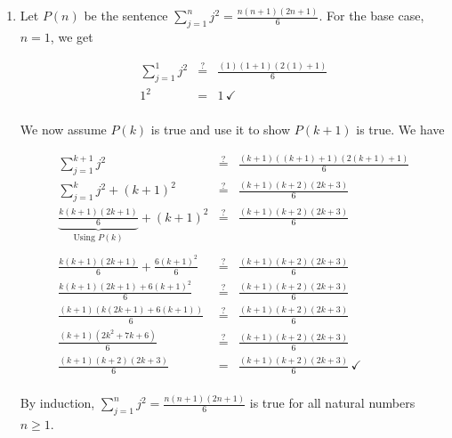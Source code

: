 \documentclass{ximera}
\begin{document}
	\author{Stitz-Zeager}




\setcounter{footnote}{0}


\begin{enumerate}

\item  Let $P(n)$ be the sentence $\displaystyle{ \sum_{j=1}^{n} j^2 = \frac{n(n+1)(2n+1)}{6}}$. For the base case, $n=1$, we get

\[ \begin{array}{rcl} 

\displaystyle{ \sum_{j=1}^{1} j^2} & \stackrel{?}{=} &  \frac{(1)(1+1)(2(1)+1)}{6} \\ [15pt]
 1^2  & = & 1 \, \checkmark \\ \end{array} \]


We now assume $P(k)$ is true and use it to show $P(k+1)$ is true.  We have


\[ \begin{array}{rcl} 

\displaystyle{ \sum_{j=1}^{k+1} j^2} & \stackrel{?}{=} &  \frac{(k+1)((k+1)+1)(2(k+1)+1)}{6} \\ [15pt]
\displaystyle{ \sum_{j=1}^{k} j^2}  + (k+1)^2 &  \stackrel{?}{=}  & \frac{(k+1)(k+2)(2k+3)}{6} \\ [15pt]
\underbrace{\frac{k(k+1)(2k+1)}{6}}_{\text{Using $P(k)$}} + (k+1)^2 &  \stackrel{?}{=}  & \frac{(k+1)(k+2)(2k+3)}{6}  \\ 

&& \\

\frac{k(k+1)(2k+1)}{6} + \frac{6(k+1)^2}{6} &  \stackrel{?}{=}  & \frac{(k+1)(k+2)(2k+3)}{6}  \\  
\frac{k(k+1)(2k+1)+6(k+1)^2}{6} &  \stackrel{?}{=}  & \frac{(k+1)(k+2)(2k+3)}{6}  \\  
\frac{(k+1)(k(2k+1)+6(k+1))}{6} &  \stackrel{?}{=}  & \frac{(k+1)(k+2)(2k+3)}{6}  \\  
\frac{(k+1)\left(2k^2+7k+6\right)}{6} &  \stackrel{?}{=}  & \frac{(k+1)(k+2)(2k+3)}{6}  \\  
\frac{(k+1)(k+2)(2k+3)}{6} & = & \frac{(k+1)(k+2)(2k+3)}{6}  \, \checkmark \\  
 \end{array} \]
 
 By induction, $\displaystyle{ \sum_{j=1}^{n} j^2 = \frac{n(n+1)(2n+1)}{6}}$ is true for all natural numbers $n \geq 1$.


\end{enumerate}
\end{document}
